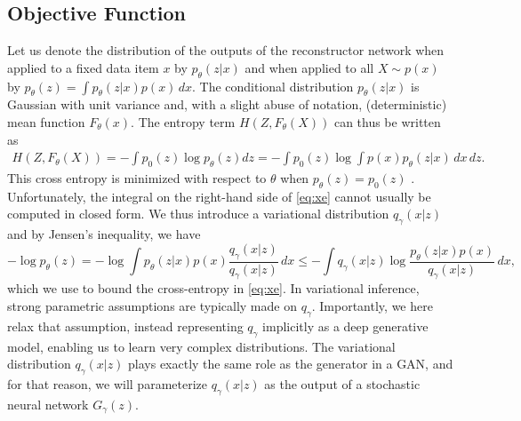 \documentclass{article}
\begin{document}
\subsection{Objective Function}
Let us denote the distribution of the outputs of the reconstructor
network when applied to a fixed data item $x$ by $p_\theta(z|x)$ and
when applied to all $X \sim p(x)$ by $p_\theta(z) = \int p_\theta(z|x)
p(x) \,dx$. The conditional distribution $p_\theta(z|x)$ is Gaussian
with unit variance and, with a slight abuse of notation,
(deterministic) mean function $F_\theta(x)$. The entropy term $H(Z,
F_\theta(X))$ can thus be written as
\begin{align}
H(Z, F_\theta(X)) = -\int p_0(z) \log p_\theta(z)dz = -\int p_0(z) \log \int p(x) p_\theta(z|x) \,dx \,dz.\label{eq:xe}
\end{align}
This cross entropy is minimized with respect to $\theta$ when
$p_\theta(z) = p_0(z)$ \citep{cover:thomas}.  Unfortunately, the
integral on the right-hand side of \eqref{eq:xe} cannot usually be
computed in closed form. We thus introduce a variational distribution
$q_\gamma (x|z)$ and by Jensen's inequality, we have
\begin{equation}
-\log p_\theta(z) = -\log \int p_\theta(z|x) p(x) \frac{q_\gamma (x|z)}{q_\gamma (x|z)} \,dx 
  \leq -\int q_\gamma(x|z) \log \frac{p_\theta(z|x)p(x)}{q_\gamma(x|z)} \,dx,\label{eq:naive}
\end{equation}
which we use to bound the cross-entropy in \eqref{eq:xe}. In
variational inference, strong parametric assumptions are typically
made on $q_\gamma$. Importantly, we here relax that assumption, instead
representing $q_\gamma$ implicitly as a deep generative model,
enabling us to learn very complex distributions. The variational
distribution $q_\gamma(x|z)$ plays exactly the same role as the
generator in a GAN, and for that reason, we will
parameterize $q_\gamma(x|z)$ as the output
of a stochastic neural network $G_\gamma(z)$.
\end{document}

